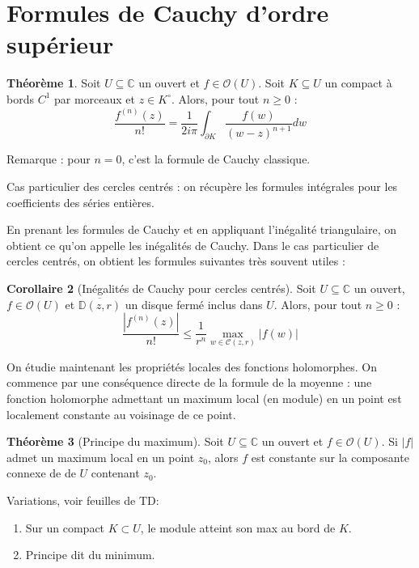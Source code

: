 \documentclass[11pt,a4paper]{book}
\newcommand{\C}{\mathbb{C}}
\theoremstyle{definition}
\newtheorem{theoreme}{Th\'eor\`eme}[section]
\newtheorem{corollaire}[theoreme]{Corollaire}
\theoremstyle{plain}
\begin{document}
\section{Formules de Cauchy d'ordre supérieur}
 
\begin{theoreme}
Soit $U\subseteq \C$ un ouvert et $f\in \mathcal O(U)$.
Soit $K\subseteq U$ un compact à bords $C^1$ par morceaux et $z\in K^\circ$.
Alors, pour tout $n\geq 0$ :
\[ \frac{f^{(n)}(z)}{n!} = \frac{1}{2i\pi} \int_{\partial K} \frac{f(w)}{(w-z)^{n+1}}dw\]
\end{theoreme}
Remarque : pour $n=0$, c'est la formule de Cauchy classique.

 Cas particulier des cercles centrés : on récupère les formules intégrales pour les coefficients des séries entières.
 
 En prenant les formules de Cauchy et en appliquant l'inégalité triangulaire, on obtient ce qu'on appelle les inégalités de Cauchy.
 Dans le cas particulier de cercles centrés, on obtient les formules suivantes très souvent utiles :
 
\begin{corollaire}[Inégalités de Cauchy pour cercles centrés]
Soit $U\subseteq \C$ un ouvert,  $f\in \mathcal O(U)$ et $\overline{\mathbb D(z,r)}$ un disque fermé inclus dans $U$.
Alors,  pour tout $n\geq 0$ :
\[ \frac{\left|f^{(n)}(z)\right|}{n!} \leq \frac{1}{r^n} \max_{w\in \mathcal C(z,r)} |f(w)|\]
\end{corollaire}
 

On étudie maintenant les propriétés locales des fonctions holomorphes.
On commence par une conséquence directe de la formule de la moyenne : une fonction holomorphe admettant un maximum local (en module) en un point est localement constante au voisinage de ce point.
 
\begin{theoreme}[Principe du maximum]
Soit $U\subseteq \C$ un ouvert et $f \in \mathcal O(U)$.
Si $|f|$ admet un maximum local en un point $z_0$, alors $f$ est constante sur la composante connexe de de $U$ contenant $z_0$.
\end{theoreme}

Variations, voir feuilles de TD:
\begin{enumerate}
\item Sur un compact $K\subset U$, le module atteint son max au bord de $K$.
\item Principe dit \og du minimum\fg.
\end{enumerate}
 
\end{document}
